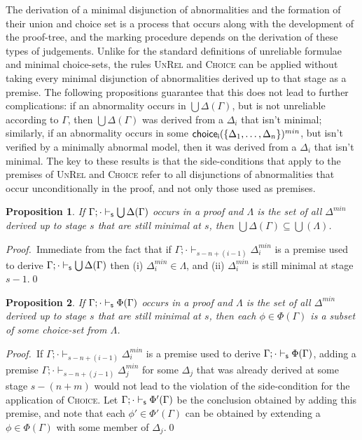 \documentclass[]{article}
\newtheorem{proposition}{Proposition}
\newcommand{\Turn}[2]
    { {#1}\vdash_{\textbf{\sf s}}  {#2}}
\begin{document}
The derivation of a minimal disjunction of abnormalities and the formation of their union and choice set is a process that occurs along with the development of the proof-tree, and the marking procedure depends on the derivation of these types of judgements. Unlike for the standard definitions of unreliable formulae and minimal choice-sets, the rules \textsc{UnRel} and \textsc{Choice} can be applied without taking every minimal disjunction of abnormalities derived up to that stage as a premise. The following propositions guarantee that this does not lead to further complications: if an abnormality occurs in $\bigcup\Delta(\Gamma)$, but is not unreliable according to $\Gamma$, then $\bigcup\Delta(\Gamma)$ was derived from a $\Delta_i$ that isn't minimal; similarly, if an abnormality occurs in some ${\sf choice_{i}}(\{\Delta_{1},\ldots, \Delta_{n}\})^{min}$, but isn't verified by a minimally abnormal model, then it was derived from a $\Delta_i$ that isn't minimal. The key to these results is that the side-conditions that apply to the premises of \textsc{UnRel} and \textsc{Choice} refer to all disjunctions of abnormalities that occur unconditionally in the proof, and not only those used as premises.

\begin{proposition}\label{prop:unrel}
    If $\Turn{\Gamma;\cdot}{\bigcup\Delta(\Gamma)}$ occurs in a proof and $\Lambda$ is the set of all $\Delta^{min}$ derived up to stage $s$ that are still minimal at $s$, then $\bigcup\Delta(\Gamma) \subseteq \bigcup(\Lambda)$.
\end{proposition}
\noindent\textsl{Proof.}~Immediate from the fact that if $\Gamma; \cdot \vdash_{s - n  + (i-1)} \Delta_i^{min}$ is a premise used to derive $\Turn{\Gamma;\cdot}{\bigcup\Delta(\Gamma)}$ then (i) $\Delta_i^{min} \in \Lambda$, and (ii) $\Delta_i^{min}$ is still minimal at stage $s-1$.\qed

\begin{proposition}\label{prop:choice}
    If $\Turn{\Gamma;\cdot}{\Phi(\Gamma)}$ occurs in a proof and $\Lambda$ is the set of all $\Delta^{min}$ derived up to stage $s$ that are still minimal at $s$, then each $\phi \in \Phi(\Gamma)$ is a subset of some choice-set from $\Lambda$.
\end{proposition}
\noindent\textsl{Proof.}~If $\Gamma; \cdot \vdash_{s - n  + (i-1)} \Delta_i^{min}$ is a premise used to derive $\Turn{\Gamma;\cdot}{\Phi(\Gamma)}$, adding a premise $\Gamma; \cdot \vdash_{s - n  + (j-1)} \Delta_j^{min}$ for some $\Delta_j$ that was already derived at some stage $s - (n + m)$ would not lead to the violation of the side-condition for the application of \textsc{Choice}. Let $\Turn{\Gamma;\cdot}{\Phi'(\Gamma)}$ be the conclusion obtained by adding this premise, and note that each $\phi' \in \Phi'(\Gamma)$ can be obtained by extending a $\phi \in \Phi(\Gamma)$ with some member of $\Delta_j$.\qed
\end{document}
